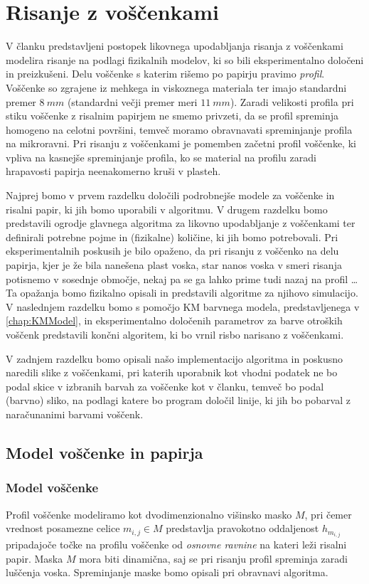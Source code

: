 \chapter{Risanje z voščenkami}
%
V članku \cite{DRudolf:BiWaxCrayon} predstavljeni postopek likovnega upodabljanja risanja z voščenkami modelira risanje na podlagi fizikalnih modelov, ki so bili eksperimentalno določeni in preizkušeni. Delu voščenke s katerim rišemo po papirju pravimo \emph{profil}. Voščenke so zgrajene iz mehkega in viskoznega materiala ter imajo standardni premer $8~mm$ (standardni večji premer meri $11~mm$). Zaradi velikosti profila pri stiku voščenke z risalnim papirjem ne smemo privzeti, da se profil spreminja homogeno na celotni površini, temveč moramo obravnavati spreminjanje profila na mikroravni. Pri risanju z voščenkami je pomemben začetni profil voščenke, ki vpliva na kasnejše spreminjanje profila, ko se material na profilu zaradi hrapavosti papirja neenakomerno kruši v plasteh.

Najprej bomo v prvem razdelku določili podrobnejše modele za voščenke in risalni papir, ki jih bomo uporabili v algoritmu. V drugem razdelku bomo predstavili ogrodje glavnega algoritma za likovno upodabljanje z voščenkami ter definirali potrebne pojme in (fizikalne) količine, ki jih bomo potrebovali. Pri eksperimentalnih poskusih je bilo opaženo, da pri risanju z voščenko na delu papirja, kjer je že bila nanešena plast voska, star nanos voska v smeri risanja potisnemo v sosednje območje, nekaj pa se ga lahko prime tudi nazaj na profil \ldots Ta opažanja bomo fizikalno opisali in predstavili algoritme za njihovo simulacijo. V naslednjem razdelku bomo s pomočjo KM barvnega modela, predstavljenega v \ref{chap:KMModel}, in eksperimentalno določenih parametrov za barve otroških voščenk predstavili končni algoritem, ki bo vrnil risbo narisano z voščenkami.

V zadnjem razdelku bomo opisali našo implementacijo algoritma in poskusno naredili slike z voščenkami, pri katerih uporabnik kot vhodni podatek ne bo podal skice v izbranih barvah za voščenke kot v članku, temveč bo podal (barvno) sliko, na podlagi katere bo program določil linije, ki jih bo pobarval z naračunanimi barvami voščenk.
%
\section{Model voščenke in papirja}
%
\subsection{Model voščenke}
%
Profil voščenke modeliramo kot dvodimenzionalno višinsko masko $M$, pri čemer vrednost posamezne celice $m_{i, j} \in M$ predstavlja pravokotno oddaljenost $h_{m_{i,j}}$ pripadajoče točke na profilu voščenke od \emph{osnovne ravnine} na kateri leži risalni papir. Maska $M$ mora biti dinamična, saj se pri risanju profil spreminja zaradi luščenja voska. Spreminjanje maske bomo opisali pri obravnavi algoritma.

